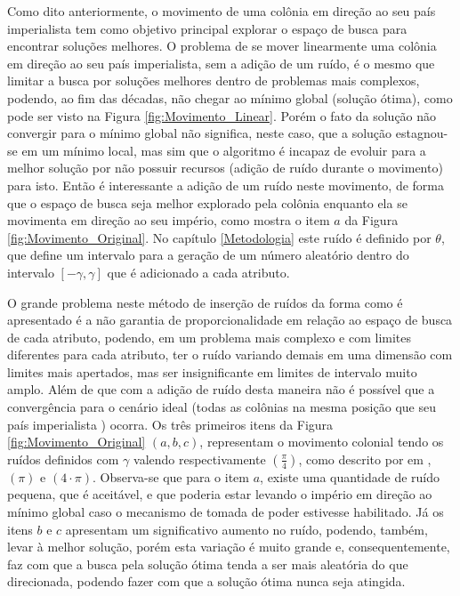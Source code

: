 Como dito anteriormente, o movimento de uma colônia em direção ao seu país imperialista tem como objetivo principal explorar o espaço de busca para encontrar soluções melhores. O problema de se mover linearmente uma colônia em direção ao seu país imperialista, sem a adição de um ruído, é o mesmo que limitar a busca por soluções melhores dentro de problemas mais complexos, podendo, ao fim das décadas, não chegar ao mínimo global (solução ótima), como pode ser visto na Figura \ref{fig:Movimento_Linear}. Porém o fato da solução não convergir para o mínimo global não significa, neste caso, que a solução estagnou-se em um mínimo local, mas sim que o algoritmo é incapaz de evoluir para a melhor solução por não possuir recursos (adição de ruído durante o movimento) para isto. Então é interessante a adição de um ruído neste movimento, de forma que o espaço de busca seja melhor explorado pela colônia enquanto ela se movimenta em direção ao seu império, como mostra o item \(a\) da Figura \ref{fig:Movimento_Original}. No capítulo \ref{Metodologia} este ruído é definido por \(\theta\), que define um intervalo para a geração de um número aleatório dentro do intervalo \( \left[ -\gamma,\gamma \right]\) que é adicionado a cada atributo. 

O grande problema neste método de inserção de ruídos da forma como é apresentado é a não garantia de proporcionalidade em relação ao espaço de busca de cada atributo, podendo, em um problema mais complexo e com limites diferentes para cada atributo, ter o ruído variando demais em uma dimensão com limites mais apertados, mas ser insignificante em limites de intervalo muito amplo. Além de que com a adição de ruído desta maneira não é possível que a convergência para o cenário ideal (todas as colônias na mesma posição que seu país imperialista ) ocorra.  Os três primeiros itens da Figura \ref{fig:Movimento_Original} \((a, b, c)\), representam o movimento colonial tendo os ruídos definidos com \(\gamma\) valendo respectivamente \(\left(\frac{\pi}{4}\right)\), como descrito por \citeauthor{atashpaz2007imperialist} em \cite{atashpaz2007imperialist}, \(\left(\pi\right)\) e \(\left(4\cdot \pi\right)\). Observa-se que para o item \(a\), existe uma quantidade de ruído pequena, que é aceitável, e que poderia estar levando o império em direção ao mínimo global caso o mecanismo de tomada de poder estivesse habilitado. Já os itens \(b\) e \(c\) apresentam um significativo aumento no ruído, podendo, também, levar à melhor solução, porém esta variação é muito grande e, consequentemente, faz com que a busca pela solução ótima tenda a ser mais aleatória do que direcionada, podendo fazer com que a solução ótima nunca seja atingida.  


